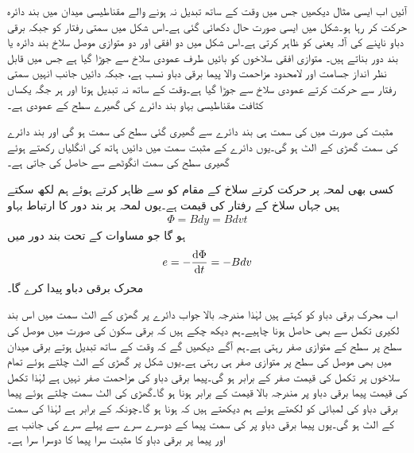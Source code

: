 آئیں اب ایسی مثال دیکھیں جس میں وقت کے ساتھ تبدیل نہ ہونے والے مقناطیسی میدان میں  بند دائرہ حرکت کر رہا ہو۔شکل  میں ایسی صورت حال دکھائی گئی ہے۔اس شکل میں  سمتی رفتار کو جبکہ  برقی دباو ناپنے کی آلہ یعنی  کو ظاہر کرتی ہے۔اس شکل میں دو افقی اور دو متوازی موصل سلاخ بند دائرہ یا بند دور بناتے ہیں۔ متوازی افقی سلاخوں کو بائیں طرف عمودی سلاخ سے جوڑا گیا ہے جس میں قابل نظر انداز جسامت اور لامحدود مزاحمت والا پیما برقی دباو نسب ہے، جبکہ دائیں جانب انہیں  سمتی رفتار سے حرکت کرتے عمودی سلاخ سے جوڑا گیا ہے۔وقت کے ساتھ نہ تبدیل ہوتا اور ہر جگہ یکساں کثافت مقناطیسی بہاو  بند دائرے کی گھیرے سطح کے عمودی ہے۔

مثبت  کی صورت میں  کی سمت ہی بند دائرے سے گھیری گئی سطح کی سمت ہو گی اور بند دائرے کی سمت گھڑی کے الٹ ہو گی۔یوں دائرے کے مثبت سمت میں دائیں ہاتھ کی انگلیاں رکھتے ہوئے گھیری سطح کی سمت انگوٹھے سے حاصل کی جاتی ہے۔ 

کسی بھی لمحہ  پر حرکت کرتے سلاخ کے مقام کو  سے ظاہر کرتے ہوئے ہم  لکھ سکتے ہیں جہاں  سلاخ کے رفتار کی قیمت ہے۔یوں لمحہ  پر بند دور کا ارتباط بہاو
\begin{align*}
\Phi=B d y =B d v t
\end{align*} 
ہو گا جو مساوات  کے تحت بند دور میں
\begin{align*}
e=-\frac{\dif \Phi}{\dif t}=-B d v
\end{align*}
محرک برقی دباو  پیدا کرے گا۔

اب محرک برقی دباو  کو کہتے ہیں لہٰذا مندرجہ بالا جواب دائرے پر گھڑی کے الٹ سمت میں اس بند لکیری تکمل سے بھی حاصل ہونا چاہیے۔ہم دیکھ چکے ہیں کہ برقی سکون کی صورت میں موصل کی سطح پر سطح کے متوازی  صفر رہتی ہے۔ہم آگے دیکھیں گے کہ وقت کے ساتھ تبدیل ہوتے برقی میدان میں بھی موصل کی سطح پر متوازی  صفر ہی رہتی ہے۔یوں شکل  پر گھڑی کے الٹ چلتے ہوئے تمام سلاخوں پر تکمل کی قیمت صفر کے برابر ہو گی۔پیما برقی دباو کی مزاحمت صفر نہیں ہے لہٰذا تکمل کی قیمت پیما برقی دباو پر مندرجہ بالا قیمت کے برابر ہونا ہو گا۔گھڑی کی الٹ سمت چلتے ہوئے پیما برقی دباو کی لمبائی کو  لکھتے ہوئے ہم دیکھتے ہیں کہ  ہونا ہو گا۔چونکہ  کے برابر ہے لہٰذا  کی سمت  کے الٹ ہو گی۔یوں پیما برقی دباو پر  کی سمت پیما کے دوسرے سرے سے پہلے سرے کی جانب ہے اور پیما پر برقی دباو کا مثبت سرا پیما کا دوسرا سرا ہے۔

